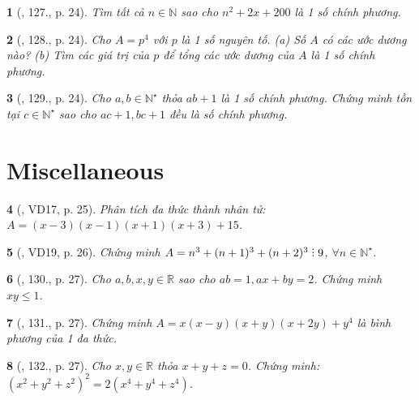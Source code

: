 \documentclass{article}
\newtheorem{baitoan}{}
\DeclareRobustCommand{\divby}{%
	\mathrel{\vbox{\baselineskip.65ex\lineskiplimit0pt\hbox{.}\hbox{.}\hbox{.}}}%
}
\begin{document}
\begin{baitoan}[\cite{Tuyen_Toan_8}, 127., p. 24]
	Tìm tất cả $n\in\mathbb{N}$ sao cho $n^2 + 2x + 200$ là 1 số chính phương.
\end{baitoan}

\begin{baitoan}[\cite{Tuyen_Toan_8}, 128., p. 24]
	Cho $A = p^4$ với $p$ là 1 số nguyên tố. (a) Số $A$ có các ước dương nào? (b) Tìm các giá trị của $p$ để tổng các ước dương của $A$ là 1 số chính phương.
\end{baitoan}

\begin{baitoan}[\cite{Tuyen_Toan_8}, 129., p. 24]
	Cho $a,b\in\mathbb{N}^\star$ thỏa $ab + 1$ là 1 số chính phương. Chứng minh tồn tại $c\in\mathbb{N}^\star$ sao cho $ac + 1,bc + 1$ đều là số chính phương.
\end{baitoan}


\section{Miscellaneous}

\begin{baitoan}[\cite{Tuyen_Toan_8}, VD17, p. 25]
	Phân tích đa thức thành nhân tử: $A = (x - 3)(x - 1)(x + 1)(x + 3) + 15$.
\end{baitoan}

\begin{baitoan}[\cite{Tuyen_Toan_8}, VD19, p. 26]
	Chứng minh $A = n^3 + (n + 1)^3 + (n + 2)^3\divby9$, $\forall n\in\mathbb{N}^\star$.
\end{baitoan}

\begin{baitoan}[\cite{Tuyen_Toan_8}, 130., p. 27]
	Cho $a,b,x,y\in\mathbb{R}$ sao cho $ab = 1,ax + by = 2$. Chứng minh $xy\le1$.
\end{baitoan}

\begin{baitoan}[\cite{Tuyen_Toan_8}, 131., p. 27]
	Chứng minh $A = x(x - y)(x + y)(x + 2y) + y^4$ là bình phương của 1 đa thức.
\end{baitoan}

\begin{baitoan}[\cite{Tuyen_Toan_8}, 132., p. 27]
	Cho $x,y\in\mathbb{R}$ thỏa $x + y + z = 0$. Chứng minh: $(x^2 + y^2 + z^2)^2 = 2(x^4 + y^4 + z^4)$.
\end{baitoan}
\end{document}
